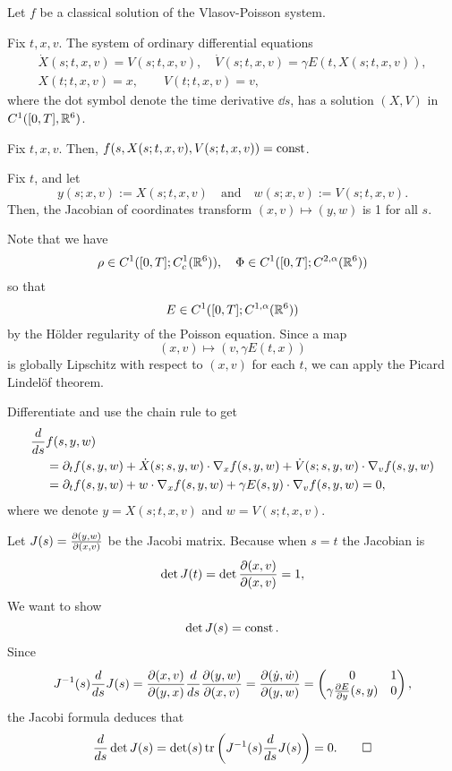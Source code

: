 \documentclass[11pt]{amsart}
\begin{document}
\begin{lem}
Let $f$ be a classical solution of the Vlasov-Poisson system.
\begin{cond}
\item Fix $t,x,v$. The system of ordinary differential equations
\begin{gather*}
\dot X(s;t,x,v)=V(s;t,x,v),\quad\dot V(s;t,x,v)=\gamma E(t,X(s;t,x,v)),\\
X(t;t,x,v)=x,\qquad V(t;t,x,v)=v,
\end{gather*}
where the dot symbol denote the time derivative $\dd{s}$, has a solution $(X,V)$ in $C^1([0,T],\mathbb{R}^6)$.
\item Fix $t,x,v$. Then, $f(s,X(s;t,x,v),V(s;t,x,v))=\operatorname{const}$.
\item Fix $t$, and let
\[y(s;x,v):=X(s;t,x,v)\quad\text{and}\quad w(s;x,v):=V(s;t,x,v).\]
Then, the Jacobian of coordinates transform $(x,v)\mapsto(y,w)$ is 1 for all $s$.
\end{cond}
\end{lem}
\begin{pfs}
\item
Note that we have
\[\rho\in C^1([0,T];C_c^1(\mathbb{R}^6)),\quad\Phi\in C^1([0,T];C^{2,\alpha}(\mathbb{R}^6))\]
so that
\[E\in C^1([0,T];C^{1,\alpha}(\mathbb{R}^6))\]
by the H\"older regularity of the Poisson equation.
Since a map
\[(x,v)\mapsto(v,\gamma E(t,x))\]
is globally Lipschitz with respect to $(x,v)$ for each $t$, we can apply the Picard Lindel\"of theorem.

\item
Differentiate and use the chain rule to get
\begin{align*}
\dd{s}&f(s,y,w)\\
&=\pd_tf(s,y,w)+\dot X(s;s,y,w)\cdot\del_xf(s,y,w)+\dot V(s;s,y,w)\cdot\del_vf(s,y,w)\\
&=\pd_tf(s,y,w)+w\cdot\del_xf(s,y,w)+\gamma E(s,y)\cdot\del_vf(s,y,w)=0,
\end{align*}
where we denote $y=X(s;t,x,v)$ and $w=V(s;t,x,v)$.

\item
Let $J(s)=\pd{(y,w)}{(x,v)}$ be the Jacobi matrix.
Because when $s=t$ the Jacobian is
\[\det J(t)=\det\pd{(x,v)}{(x,v)}=1,\]
We want to show
\[\det J(s)=\operatorname{const}.\]
Since
\[J^{-1}(s)\dd{s}J(s)=\pd{(x,v)}{(y,x)}\dd{s}\pd{(y,w)}{(x,v)}=\pd{(\dot y,\dot w)}{(y,w)}=\mat{0&1\\\gamma\pd{E}{y}(s,y)&0},\]
the Jacobi formula deduces that
\[\dd{s}\det J(s)=\det(s)\tr\left(J^{-1}(s)\dd{s}J(s)\right)=0.\qedhere\]
\end{pfs}
\end{document}
